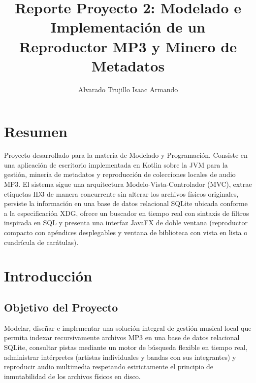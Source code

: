 \documentclass[12pt,a4paper]{article}
\title{\textbf{Reporte Proyecto 2: Modelado e Implementación de un Reproductor MP3 y Minero de Metadatos}}
\author{Alvarado Trujillo Isaac Armando}
\begin{document}
\maketitle

\section{Resumen}
Proyecto desarrollado para la materia de Modelado y Programación. Consiste en una aplicación de escritorio implementada en Kotlin sobre la JVM para la gestión, minería de metadatos y reproducción de colecciones locales de audio MP3. El sistema sigue una arquitectura Modelo-Vista-Controlador (MVC), extrae etiquetas ID3 de manera concurrente sin alterar los archivos físicos originales, persiste la información en una base de datos relacional SQLite ubicada conforme a la especificación XDG, ofrece un buscador en tiempo real con sintaxis de filtros inspirada en SQL y presenta una interfaz JavaFX de doble ventana (reproductor compacto con apéndices desplegables y ventana de biblioteca con vista en lista o cuadrícula de carátulas).

\section{Introducción}

\subsection{Objetivo del Proyecto}
Modelar, diseñar e implementar una solución integral de gestión musical local que permita indexar recursivamente archivos MP3 en una base de datos relacional SQLite, consultar pistas mediante un motor de búsqueda flexible en tiempo real, administrar intérpretes (artistas individuales y bandas con sus integrantes) y reproducir audio multimedia respetando estrictamente el principio de inmutabilidad de los archivos físicos en disco.
\end{document}
